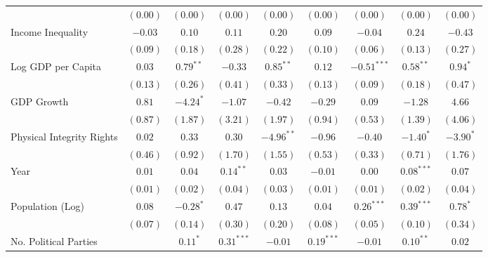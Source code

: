 \begin{table}[!htbp]
\begin{center}
{\begin{tabular}{l c c c c c c c c}
                             & $(0.00)$       & $(0.00)$     & $(0.00)$      & $(0.00)$     & $(0.00)$      & $(0.00)$      & $(0.00)$      & $(0.00)$     \\
Income Inequality            & $-0.03$        & $0.10$       & $0.11$        & $0.20$       & $0.09$        & $-0.04$       & $0.24$        & $-0.43$      \\
                             & $(0.09)$       & $(0.18)$     & $(0.28)$      & $(0.22)$     & $(0.10)$      & $(0.06)$      & $(0.13)$      & $(0.27)$     \\
Log GDP per Capita           & $0.03$         & $0.79^{**}$  & $-0.33$       & $0.85^{**}$  & $0.12$        & $-0.51^{***}$ & $0.58^{**}$   & $0.94^{*}$   \\
                             & $(0.13)$       & $(0.26)$     & $(0.41)$      & $(0.33)$     & $(0.13)$      & $(0.09)$      & $(0.18)$      & $(0.47)$     \\
GDP Growth                   & $0.81$         & $-4.24^{*}$  & $-1.07$       & $-0.42$      & $-0.29$       & $0.09$        & $-1.28$       & $4.66$       \\
                             & $(0.87)$       & $(1.87)$     & $(3.21)$      & $(1.97)$     & $(0.94)$      & $(0.53)$      & $(1.39)$      & $(4.06)$     \\
Physical Integrity Rights    & $0.02$         & $0.33$       & $0.30$        & $-4.96^{**}$ & $-0.96$       & $-0.40$       & $-1.40^{*}$   & $-3.90^{*}$  \\
                             & $(0.46)$       & $(0.92)$     & $(1.70)$      & $(1.55)$     & $(0.53)$      & $(0.33)$      & $(0.71)$      & $(1.76)$     \\
Year                         & $0.01$         & $0.04$       & $0.14^{**}$   & $0.03$       & $-0.01$       & $0.00$        & $0.08^{***}$  & $0.07$       \\
                             & $(0.01)$       & $(0.02)$     & $(0.04)$      & $(0.03)$     & $(0.01)$      & $(0.01)$      & $(0.02)$      & $(0.04)$     \\
Population (Log)             & $0.08$         & $-0.28^{*}$  & $0.47$        & $0.13$       & $0.04$        & $0.26^{***}$  & $0.39^{***}$  & $0.78^{*}$   \\
                             & $(0.07)$       & $(0.14)$     & $(0.30)$      & $(0.20)$     & $(0.08)$      & $(0.05)$      & $(0.10)$      & $(0.34)$     \\
No. Political Parties        &                & $0.11^{*}$   & $0.31^{***}$  & $-0.01$      & $0.19^{***}$  & $-0.01$       & $0.10^{**}$   & $0.02$       \\

\end{tabular}}
\end{center}
\end{table}
